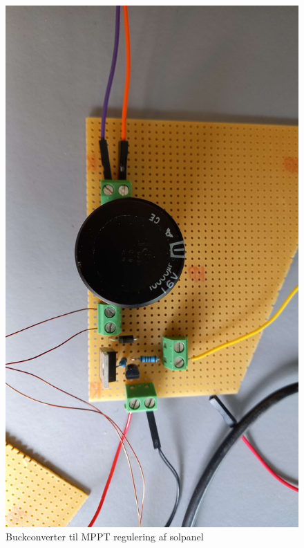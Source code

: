 \documentclass[../main.tex]{subfiles}
\begin{document}
            \begin{figure}[H]
            \includegraphics[scale = 0.1]{Dokumentation/Pictures/PV_MPPTbuck.jpg}
            \caption{Buckconverter til MPPT regulering af solpanel}
            \label{pic: MPPTbuck}
            \end{figure}
            
\end{document}

